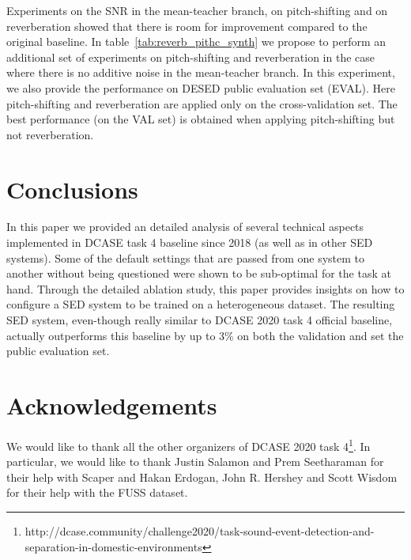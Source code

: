 \documentclass{article}
\begin{document}
\begin{sloppy}
Experiments on the SNR in the mean-teacher branch, on pitch-shifting and on reverberation showed that there is room for improvement compared to the original baseline. In table~\ref{tab:reverb_pithc_synth} we propose to perform an additional set of experiments on pitch-shifting and reverberation in the case where there is no additive noise in the mean-teacher branch. In this experiment, we also provide the performance on DESED public evaluation set (EVAL). Here pitch-shifting and reverberation are applied only on the cross-validation set. The best performance (on the VAL set) is obtained when applying pitch-shifting but not reverberation.

\section{Conclusions}
In this paper we provided an detailed analysis of several technical aspects implemented in DCASE task 4 baseline since 2018 (as well as in other SED systems). Some of the default settings that are passed from one system to another without being questioned were shown to be sub-optimal for the task at hand. Through the detailed ablation study, this paper provides insights on how to configure a SED system to be trained on a heterogeneous dataset. The resulting SED system, even-though really similar to DCASE 2020 task 4 official baseline, actually outperforms this baseline by up to 3\% on both the validation and set the public evaluation set.

\section{Acknowledgements}
We would like to thank all the other organizers of DCASE 2020 task 4\footnote{http://dcase.community/challenge2020/task-sound-event-detection-and-separation-in-domestic-environments}. In particular, we would like to thank Justin Salamon and Prem Seetharaman for their help with Scaper and Hakan Erdogan, John R. Hershey and Scott Wisdom for their help with the FUSS dataset.







\end{sloppy}
\end{document}
